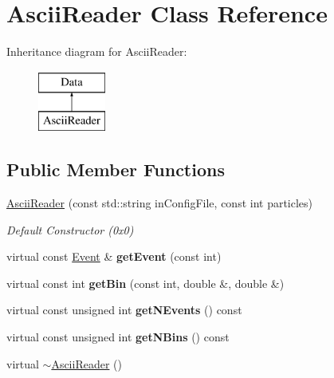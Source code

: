\hypertarget{class_ascii_reader}{\section{Ascii\-Reader Class Reference}
\label{class_ascii_reader}
}
Inheritance diagram for Ascii\-Reader\-:\begin{figure}[H]
\begin{center}
\leavevmode
\includegraphics[height=2.000000cm]{class_ascii_reader}
\end{center}
\end{figure}
\subsection*{Public Member Functions}
\begin{DoxyCompactItemize}
\item 
\hypertarget{class_ascii_reader_a7e4d19ef330f588df7135343a1757ed2}{\hyperlink{class_ascii_reader_a7e4d19ef330f588df7135343a1757ed2}{Ascii\-Reader} (const std\-::string in\-Config\-File, const int particles)}\label{class_ascii_reader_a7e4d19ef330f588df7135343a1757ed2}

\begin{DoxyCompactList}\small\item\em Default Constructor (0x0) \end{DoxyCompactList}\item 
\hypertarget{class_ascii_reader_a908d6716adcb6dac4b018f6ebb2639f3}{virtual const \hyperlink{class_event}{Event} \& {\bfseries get\-Event} (const int)}\label{class_ascii_reader_a908d6716adcb6dac4b018f6ebb2639f3}

\item 
\hypertarget{class_ascii_reader_a6466d1cf0c68cab718278d065511577d}{virtual const int {\bfseries get\-Bin} (const int, double \&, double \&)}\label{class_ascii_reader_a6466d1cf0c68cab718278d065511577d}

\item 
\hypertarget{class_ascii_reader_add4df8989c883fc35d05cc95b8df0941}{virtual const unsigned int {\bfseries get\-N\-Events} () const }\label{class_ascii_reader_add4df8989c883fc35d05cc95b8df0941}

\item 
\hypertarget{class_ascii_reader_a4205de0cc54423de3f78654d059b07bc}{virtual const unsigned int {\bfseries get\-N\-Bins} () const }\label{class_ascii_reader_a4205de0cc54423de3f78654d059b07bc}

\item 
virtual \hyperlink{class_ascii_reader_a5b248943b9a4cb931ec58a00c31168d8}{$\sim$\-Ascii\-Reader} ()
\end{DoxyCompactItemize}


